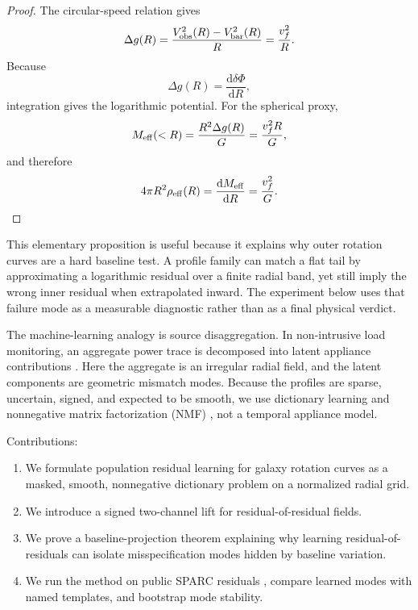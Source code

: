 \documentclass[10pt,twocolumn]{article}
\newcommand{\dd}{\mathrm{d}}
\newcommand{\Dg}{\Delta g}
\begin{document}
\begin{proof}
The circular-speed relation gives
\begin{equation}
\Dg(R)=\frac{V_{\rm obs}^2(R)-V_{\rm bar}^2(R)}{R}
      =\frac{v_f^2}{R}.
\end{equation}
Because
\begin{equation}
\Dg(R)=\frac{\dd\delta\Phi}{\dd R},
\end{equation}
integration gives the logarithmic potential. For the spherical proxy,
\begin{equation}
M_{\rm eff}(<R)=\frac{R^2\Dg(R)}{G}
              =\frac{v_f^2R}{G},
\end{equation}
and therefore
\begin{equation}
4\pi R^2\rho_{\rm eff}(R)
=\frac{\dd M_{\rm eff}}{\dd R}
=\frac{v_f^2}{G}.
\end{equation}
\end{proof}

This elementary proposition is useful because it explains why outer rotation
curves are a hard baseline test. A profile family can match a flat tail by
approximating a logarithmic residual over a finite radial band, yet still imply
the wrong inner residual when extrapolated inward. The experiment below uses
that failure mode as a measurable diagnostic rather than as a final physical
verdict.

The machine-learning analogy is source disaggregation. In non-intrusive load
monitoring, an aggregate power trace is decomposed into latent appliance
contributions \citep{Hart1992,Kolter2012}. Here the aggregate is an irregular
radial field, and the latent components are geometric mismatch modes. Because
the profiles are sparse, uncertain, signed, and expected to be smooth, we use
dictionary learning and nonnegative matrix factorization (NMF)
\citep{LeeSeung1999,Aharon2006,Mairal2010}, not a temporal appliance model.

Contributions:
\begin{enumerate}
\item We formulate population residual learning for galaxy rotation curves as a
masked, smooth, nonnegative dictionary problem on a normalized radial grid.
\item We introduce a signed two-channel lift for residual-of-residual fields.
\item We prove a baseline-projection theorem explaining why learning
residual-of-residuals can isolate misspecification modes hidden by baseline
variation.
\item We run the method on public SPARC residuals \citep{Lelli2016}, compare
learned modes with named templates, and bootstrap mode stability.
\end{enumerate}
\end{document}
